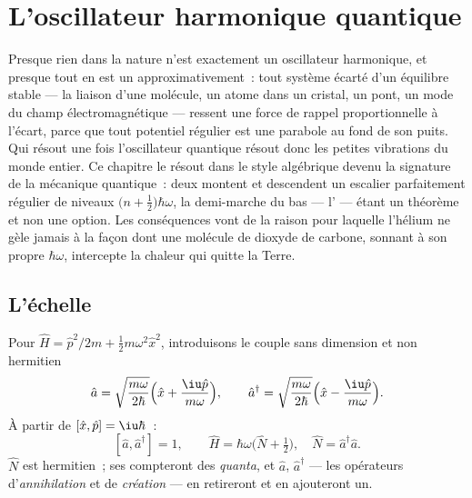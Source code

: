\chapter{L'oscillateur harmonique quantique}\label{ch:b3:harmonic-oscillator}

Presque rien dans la nature n'est exactement un oscillateur
harmonique, et presque tout en est un approximativement~: tout système
écarté d'un équilibre stable --- la liaison d'une molécule, un atome
dans un cristal, un pont, un mode du champ électromagnétique ---
ressent une force de rappel proportionnelle à l'écart, parce que tout
potentiel régulier est une parabole au fond de son puits. Qui résout
une fois l'oscillateur quantique résout donc les petites vibrations du
monde entier. Ce chapitre le résout dans le style algébrique devenu la
signature de la mécanique quantique~: deux 
montent et descendent un escalier parfaitement régulier de niveaux $\big(n +
\tfrac12\big)\hbar\omega$, la demi-marche du bas --- l' --- étant un théorème et non une option. Les conséquences
vont de la raison pour laquelle l'hélium ne gèle jamais à la façon dont
une molécule de dioxyde de carbone, sonnant à son propre $\hbar\omega$,
intercepte la chaleur qui quitte la Terre.

\section{L'échelle}

\begin{definition}\label{def:b3:harmonic-oscillator:ladder}
Pour $\hat H = \hat p^2/2m + \tfrac12 m\omega^2\hat x^2$, introduisons
le couple sans dimension et non hermitien
\[
\hat a = \sqrt{\frac{m\omega}{2\hbar}}\Big(\hat x +
\frac{\iu\hat p}{m\omega}\Big) , \qquad
\hat a^\dagger = \sqrt{\frac{m\omega}{2\hbar}}\Big(\hat x -
\frac{\iu\hat p}{m\omega}\Big) .
\]
À partir de $[\hat x, \hat p] = \iu\hbar$~:
\[
[\hat a, \hat a^\dagger] = 1 , \qquad
\hat H = \hbar\omega\Big(\hat N + \tfrac12\Big) , \quad
\hat N = \hat a^\dagger\hat a .
\]
$\hat N$ est hermitien~; ses  compteront des
\emph{quanta}, et $\hat a$, $\hat a^\dagger$ --- les opérateurs
d'\emph{annihilation} et de \emph{création} --- en retireront et en
ajouteront un.
\end{definition}

